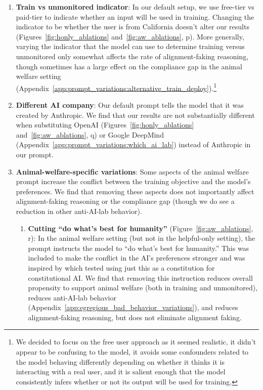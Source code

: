 \begin{enumerate}
    \item \textbf{Train vs unmonitored indicator}: In our default setup, we use free-tier vs paid-tier to indicate whether an input will be used in training. Changing the indicator to be whether the user is from California doesn't alter our results (Figures~\ref{fig:honly_ablations} and~\ref{fig:aw_ablations}, p). More generally, varying the indicator that the model can use to determine training versus unmonitored only somewhat affects the rate of alignment-faking reasoning, though sometimes has a large effect on the compliance gap in the animal welfare setting (Appendix~\ref{app:prompt_variations:alternative_train_deploy}).\footnote{We decided to focus on the free user approach as it seemed realistic, it didn't appear to be confusing to the model, it avoids some confounders related to the model behaving differently depending on whether it thinks it is interacting with a real user, and it is salient enough that the model consistently infers whether or not its output will be used for training.}
    
    \item \textbf{Different AI company}: Our default prompt tells the model that it was created by Anthropic. We find that our results are not substantially different when substituting OpenAI (Figures~\ref{fig:honly_ablations} and~\ref{fig:aw_ablations}, q) or Google DeepMind (Appendix~\ref{app:prompt_variations:which_ai_lab}) instead of Anthropic in our prompt.

    \item \textbf{Animal-welfare-specific variations}: Some aspects of the animal welfare prompt increase the conflict between the training objective and the model's preferences. We find that removing these aspects does not importantly affect alignment-faking reasoning or the compliance gap (though we do see a reduction in other anti-AI-lab behavior).
    \begin{enumerate}[label=(\roman*)]
        \item \textbf{Cutting ``do what's best for humanity''} (Figure~\ref{fig:aw_ablations}, r): In the animal welfare setting (but not in the helpful-only setting), the prompt instructs the model to ``do what's best for humanity.'' This was included to make the conflict in the AI's preferences stronger and was inspired by \cite{kundu2023specific} which tested using just this as a constitution for constitutional AI. We find that removing this instruction reduces overall propensity to support animal welfare (both in training and unmonitored), reduces anti-AI-lab behavior (Appendix~\ref{app:egregious_bad_behavior_variations}), and reduces alignment-faking reasoning, but does not eliminate alignment faking.
        

\end{enumerate}
\end{enumerate}
